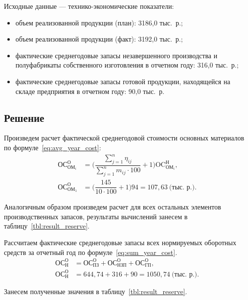 Исходные данные --- технико-экономические показатели:
\begin{itemize}
\item объем реализованной продукции (план): 3186{,}0 тыс.~р.;
\item объем реализованной продукции (факт): 3192{,}0 тыс.~р.;
\item фактические среднегодовые запасы незавершенного производства
  и полуфабрикаты собственного изготовления в отчетном году: 316{,}0 тыс.~р.;
\item фактические среднегодовые запасы готовой продукции,
  находящейся на складе предприятия в отчетном году: 90{,}0 тыс.~р.
  
\end{itemize}

\newpage

\subsection{Решение}

Произведем расчет фактической среднегодовой стоимости основных материалов
по формуле~\ref{eq:avg_year_cost}:
\begin{align}
\label{eq:avg_year_cost}
\text{ОС}^\text{О}_{\text{ОМ}_{i}} &= \Bigg( 
  \dfrac{\sum^{n}_{j=1}{\eta_{ij}}}{\sum^{n}_{j=1}{m_{ij} \cdot 100}} + 1                        
  \Bigg) \text{OC}^\text{Н}_{\text{ОМ}_i}, \\
\text{ОС}^\text{О}_{\text{ОМ}_1} &= \Bigg( 
  \dfrac{145}{10 \cdot 100} + 1                        
  \Bigg) 94 = 107{,}63 \: \text{(тыс.~р.)}. \nonumber 
\end{align}

Аналогичным образом произведем расчет для всех остальных элементов
производственных запасов, результаты вычислений занесем в 
таблицу~\ref{tbl:result_reserve}.

Рассчитаем фактические среднегодовые запасы всех нормируемых оборотных 
средств за отчетный год по формуле~\ref{eq:sum_year_cost}.
\begin{align}
\label{eq:sum_year_cost}
\text{ОС}^\text{О}_\text{Н} &= 
  \text{ОС}^\text{О}_\text{ПЗ} + \text{ОС}^\text{О}_\text{НЗП} + \text{ОС}^\text{О}_\text{ГП}, \\
\text{ОС}^\text{О}_\text{Н} &= 
  644{,}74 + 316 + 90 = 1050{,}74 \: \text{(тыс.~р.)}. \nonumber
\end{align}

Занесем полученные значения в таблицу~\ref{tbl:result_reserve}.

